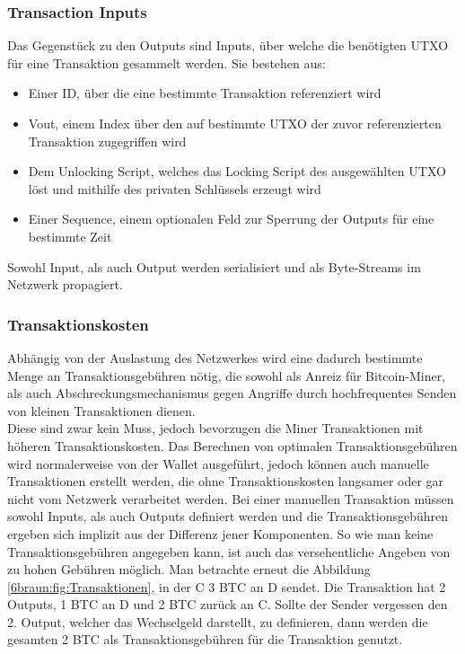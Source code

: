 \subsubsection{Transaction Inputs}
Das Gegenstück zu den Outputs sind Inputs, über welche die benötigten UTXO für eine Transaktion gesammelt werden. Sie bestehen aus:
\begin{itemize}
	\item Einer ID, über die eine bestimmte Transaktion referenziert wird
	\item Vout, einem Index über den auf bestimmte UTXO der zuvor referenzierten Transaktion zugegriffen wird
	\item Dem Unlocking Script, welches das Locking Script des ausgewählten UTXO löst und mithilfe des privaten Schlüssels erzeugt wird
	\item Einer Sequence, einem optionalen Feld zur Sperrung der Outputs für eine bestimmte Zeit
\end{itemize}
Sowohl Input, als auch Output werden serialisiert und als Byte-Streams im Netzwerk propagiert.\\
\subsubsection{Transaktionskosten}
Abhängig von der Auslastung des Netzwerkes wird eine dadurch bestimmte Menge an Transaktionsgebühren nötig, die sowohl als Anreiz für Bitcoin-Miner, als auch Abschreckungsmechanismus gegen Angriffe durch hochfrequentes Senden von kleinen Transaktionen dienen.\\
Diese sind zwar kein Muss, jedoch bevorzugen die Miner Transaktionen mit höheren Transaktionskosten. 
Das Berechnen von optimalen Transaktionsgebühren wird normalerweise von der Wallet ausgeführt, jedoch können auch manuelle Transaktionen erstellt werden, die ohne Transaktionskosten langsamer oder gar nicht vom Netzwerk verarbeitet werden.
Bei einer manuellen Transaktion müssen sowohl Inputs, als auch Outputs definiert werden und die Transaktionsgebühren ergeben sich implizit aus der Differenz jener Komponenten. So wie man keine Transaktionsgebühren angegeben kann, ist auch das versehentliche Angeben von zu hohen Gebühren möglich. Man betrachte erneut die Abbildung \ref{6braun:fig:Transaktionen}, in der C 3 BTC an D sendet. Die Transaktion hat 2 Outputs, 1 BTC an D und 2 BTC zurück an C. Sollte der Sender vergessen den 2. Output, welcher das Wechselgeld darstellt, zu definieren, dann werden die gesamten 2 BTC als Transaktionsgebühren für die Transaktion genutzt.\\

